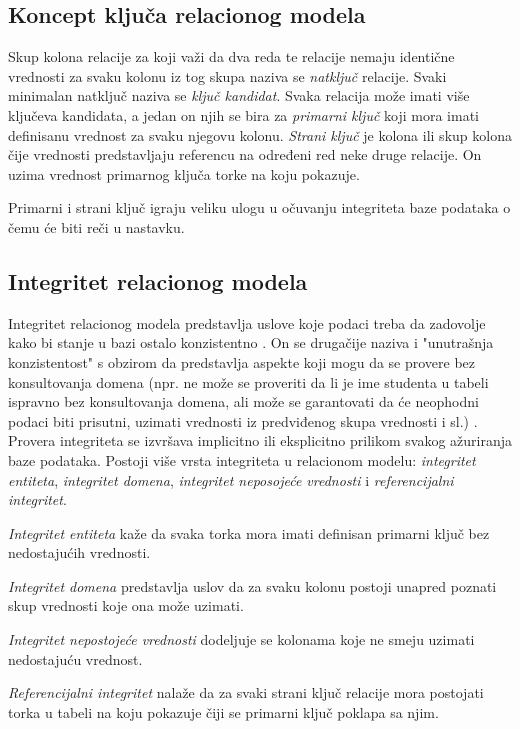 \documentclass[12pt,oneside]{memoir}
\begin{document}
\subsection{Koncept ključa relacionog modela}

Skup kolona relacije za koji važi da dva reda te relacije nemaju identične vrednosti za svaku kolonu iz tog skupa naziva  se \textit{natključ} relacije. Svaki minimalan natključ naziva se \textit{ključ kandidat}. Svaka relacija može imati više ključeva kandidata, a jedan on njih se bira za  \textit{primarni ključ} koji mora imati definisanu vrednost za svaku njegovu kolonu.
\textit{Strani ključ} je kolona ili skup kolona čije vrednosti predstavljaju referencu na određeni red neke druge relacije. On uzima vrednost primarnog ključa torke na koju pokazuje. 

Primarni i strani ključ igraju veliku ulogu u očuvanju integriteta baze podataka o čemu će biti reči u nastavku.

\subsection{Integritet relacionog modela}

Integritet relacionog modela predstavlja uslove koje podaci treba da zadovolje kako bi stanje u bazi ostalo konzistentno \cite{URBP} . On se drugačije naziva i "unutrašnja konzistentost" s obzirom da predstavlja aspekte koji mogu da se provere bez konsultovanja domena (npr. ne može se proveriti da li je ime studenta u tabeli ispravno bez konsultovanja domena, ali može se garantovati da će neophodni podaci biti prisutni, uzimati vrednosti iz predviđenog skupa vrednosti i sl.) . Provera integriteta se izvršava implicitno ili eksplicitno prilikom svakog ažuriranja baze podataka. Postoji više vrsta integriteta u relacionom modelu:  \textit{integritet entiteta}, \textit{integritet domena}, \textit{integritet neposojeće vrednosti} i \textit{referencijalni integritet}.

 \textit{Integritet entiteta} kaže da svaka torka mora imati definisan primarni ključ bez nedostajućih vrednosti.

\textit{Integritet domena} predstavlja uslov da za svaku kolonu postoji unapred poznati skup vrednosti koje ona može uzimati.

\textit{Integritet nepostojeće vrednosti} dodeljuje se kolonama koje  ne smeju uzimati nedostajuću vrednost.

\textit{Referencijalni integritet} nalaže da za svaki strani ključ relacije mora postojati torka u tabeli na koju pokazuje čiji se primarni ključ poklapa sa njim.
\end{document}
